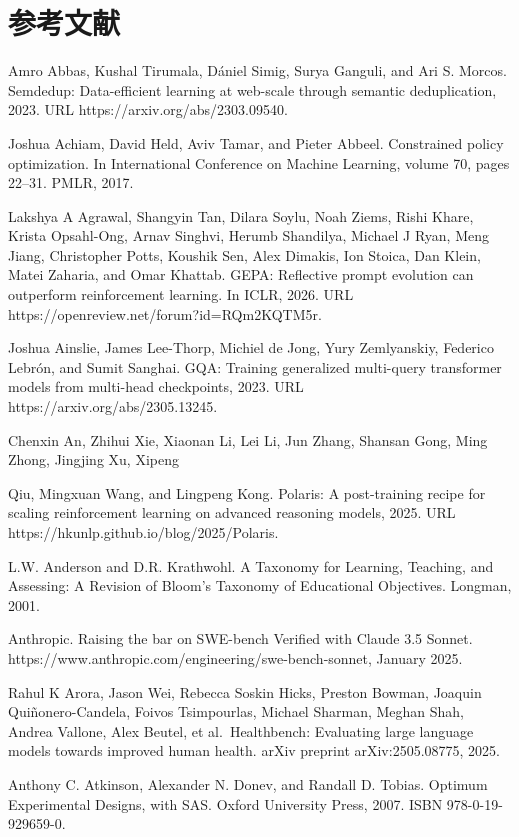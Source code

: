 \documentclass[
  10
]{article}
\begin{document}
\section*{参考文献}\label{references}

Amro Abbas, Kushal Tirumala, Dániel Simig, Surya Ganguli, and Ari S.
Morcos. Semdedup: Data-efficient learning at web-scale through semantic
deduplication, 2023. URL https://arxiv.org/abs/2303.09540.

Joshua Achiam, David Held, Aviv Tamar, and Pieter Abbeel. Constrained
policy optimization. In International Conference on Machine Learning,
volume 70, pages 22--31. PMLR, 2017.

Lakshya A Agrawal, Shangyin Tan, Dilara Soylu, Noah Ziems, Rishi Khare,
Krista Opsahl-Ong, Arnav Singhvi, Herumb Shandilya, Michael J Ryan, Meng
Jiang, Christopher Potts, Koushik Sen, Alex Dimakis, Ion Stoica, Dan
Klein, Matei Zaharia, and Omar Khattab. GEPA: Reflective prompt
evolution can outperform reinforcement learning. In ICLR, 2026. URL
https://openreview.net/forum?id=RQm2KQTM5r.

Joshua Ainslie, James Lee-Thorp, Michiel de Jong, Yury Zemlyanskiy,
Federico Lebrón, and Sumit Sanghai. GQA: Training generalized
multi-query transformer models from multi-head checkpoints, 2023. URL
https://arxiv.org/abs/2305.13245.

Chenxin An, Zhihui Xie, Xiaonan Li, Lei Li, Jun Zhang, Shansan Gong,
Ming Zhong, Jingjing Xu, Xipeng



Qiu, Mingxuan Wang, and Lingpeng Kong. Polaris: A post-training recipe
for scaling reinforcement learning on advanced reasoning models, 2025.
URL https://hkunlp.github.io/blog/2025/Polaris.

L.W. Anderson and D.R. Krathwohl. A Taxonomy for Learning, Teaching,
and Assessing: A Revision of Bloom's Taxonomy of Educational Objectives.
Longman, 2001.

Anthropic. Raising the bar on SWE-bench Verified with Claude 3.5 Sonnet.
https://www.anthropic.com/engineering/swe-bench-sonnet, January 2025.

Rahul K Arora, Jason Wei, Rebecca Soskin Hicks, Preston Bowman, Joaquin
Quiñonero-Candela, Foivos Tsimpourlas, Michael Sharman, Meghan Shah,
Andrea Vallone, Alex Beutel, et al.~Healthbench: Evaluating large
language models towards improved human health. arXiv preprint
arXiv:2505.08775, 2025.

Anthony C. Atkinson, Alexander N. Donev, and Randall D. Tobias. Optimum
Experimental Designs, with SAS. Oxford University Press, 2007. ISBN
978-0-19-929659-0.
\end{document}
